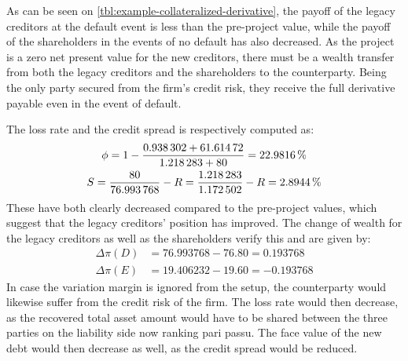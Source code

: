 \documentclass[../main.tex]{subfiles}
\begin{document}
        As can be seen on \cref{tbl:example-collateralized-derivative}, the payoff of the legacy creditors at the default event is less than the pre-project value, while the payoff of the shareholders in the events of no default has also decreased. As the project is a zero net present value for the new creditors, there must be a wealth transfer from both the legacy creditors and the shareholders to the counterparty. Being the only party secured from the firm's credit risk, they receive the full derivative payable even in the event of default.

        The loss rate and the credit spread is respectively computed as:
            \begin{gather}
                \phi 
                = 
                    1 
                    - 
                    \frac{
                        \num{0.938302}+\num{61.61472}
                    }{
                        \num{1.218283}+\num{80}
                    }
                = 
                    \pct{0.229816}
                \\
                S 
                = 
                    \frac{
                        \num{80}    
                    }{
                        \num{76.993768} 
                    } 
                    - 
                    \grossrfrate 
                = 
                    \frac{
                        \num{1.218283}
                    }{        
                        \num{1.172502} 
                    } 
                    -
                    \grossrfrate 
                = 
                    \pct{0.028944} 
            \end{gather}
        These have both clearly decreased compared to the pre-project values, which suggest that the legacy creditors' position has improved.
        The change of wealth for the legacy creditors as well as the shareholders verify this and are given by:
        \begin{align}
            \Delta \pi(D) &= \num{76.993768} - \num{76.80} = \num{0.193768}\\
            \Delta \pi(E) &= \num{19.406232} - \num{19.60} = \num{-0.193768}
        \end{align}
        In case the variation margin is ignored from the setup, the counterparty would likewise suffer from the credit risk of the firm.
        The loss rate would then decrease,
        as the recovered total asset amount would have to be shared between the three parties on the liability side now ranking pari passu.
        The face value of the new debt would then decrease as well, as the credit spread would be reduced.
\end{document}
